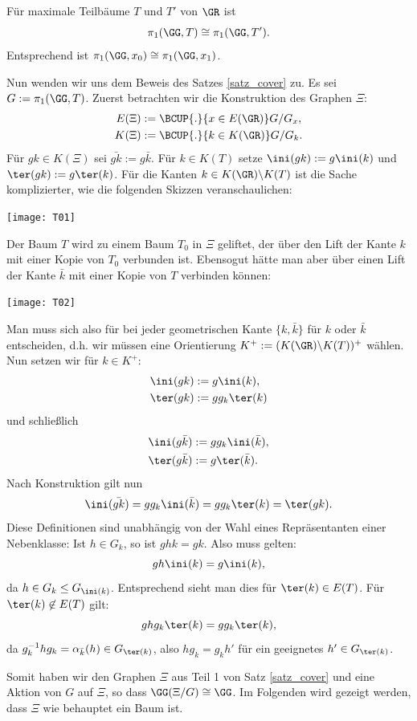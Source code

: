 \FOLG Für maximale Teilbäume $T$ und $T'$ von $\GR$ ist
\[
\pi_1(\GG,T) \cong \pi_1(\GG,T').
\]
Entsprechend ist $\pi_1(\GG,x_0)\cong\pi_1(\GG,x_1)$.



Nun wenden wir uns dem Beweis des Satzes \ref{satz_cover} zu.
Es sei $G:= \pi_1(\GG,T)$.
Zuerst betrachten wir die Konstruktion des Graphen $\Xi$:
\begin{align*}
E(\Xi) &:= \BCUP{.}{x\in E(\GR)} G/G_x, \\
K(\Xi) &:= \BCUP{.}{k\in K(\GR)} G/G_k.
\end{align*}
Für $gk\in K(\Xi)$ sei $\bar{gk}:=g\bar{k}$.
Für $k\in K(T)$ setze $\ini(gk):=g\ini(k)$ und
$\ter(gk):=g\ter(k)$.
Für die Kanten $k\in K(\GR)\backslash K(T)$ ist die Sache 
komplizierter, wie die folgenden Skizzen veranschaulichen:
\begin{center}
	\texttt{[image: T01]}
\end{center}
Der Baum $T$ wird zu einem Baum $T_0$ in $\Xi$ geliftet, der
über den Lift der Kante $k$ mit einer Kopie von $T_0$ verbunden ist.
Ebensogut hätte man aber über einen Lift der Kante $\bar{k}$
mit einer Kopie von $T$ verbinden können:
\begin{center}
	\texttt{[image: T02]}
\end{center}
Man muss sich also für bei jeder geometrischen Kante $\{k,\bar{k}\}$
für $k$ oder $\bar{k}$ entscheiden, d.h. wir müssen eine Orientierung
$K^+ := (K(\GR)\backslash K(T))^+$ wählen.
Nun setzen wir für $k\in K^+$:
\begin{align*}
\ini(gk) &:= g \ini(k), \\
\ter(gk) &:= g g_k \ter(k)
\end{align*}
und schließlich
\begin{align*}
\ini(g\bar{k}) &:= g g_k \ini(\bar{k}), \\
\ter(g \bar{k}) &:= g \ter(\bar{k}).
\end{align*}
Nach Konstruktion gilt nun
\[
\ini(\bar{gk}) = g g_k \ini(\bar{k}) = g g_k \ter(k)
= \ter(gk).
\]
Diese Definitionen sind unabhängig von der Wahl eines Repräsentanten
einer Nebenklasse: Ist $h\in G_k$, so ist $g h k = g k$.
Also muss gelten:
\[
g h \ini(k) = g \ini(k),
\]
da $h\in G_k \leq G_{\ini(k)}$. Entsprechend sieht man dies
für $\ter(k)\in E(T)$.
Für $\ter(k)\not\in E(T)$ gilt:
\[
g h g_k \ter(k) = g g_k \ter(k),
\]
da $ g_k^{-1} h g_k = \alpha_{\bar{k}}(h) \in G_{\ter(k)}$,
also $h g_k = g_k h'$ für ein geeignetes $h'\in G_{\ter(k)}$.

Somit haben wir den Graphen $\Xi$ aus Teil 1 von Satz \ref{satz_cover}
und eine Aktion von $G$ auf $\Xi$, so dass $\GG(\Xi/G)\cong \GG$.
Im Folgenden wird gezeigt werden, dass $\Xi$ wie behauptet ein Baum
ist.

